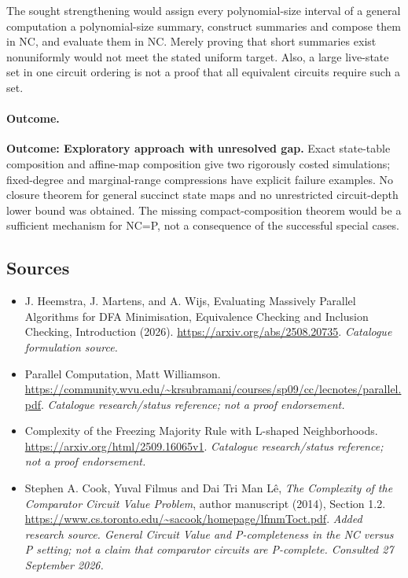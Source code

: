 \documentclass[11pt,a4paper]{article}
\begin{document}
The sought strengthening would assign every polynomial-size interval of
a general computation a polynomial-size summary, construct summaries and
compose them in NC, and evaluate them in NC. Merely proving that short
summaries exist nonuniformly would not meet the stated uniform target.
Also, a large live-state set in one circuit ordering is not a proof that
all equivalent circuits require such a set.

\paragraph{Outcome.}
\textbf{Outcome: Exploratory approach with unresolved gap.}
Exact state-table composition and affine-map composition give two rigorously
costed simulations; fixed-degree and marginal-range compressions have
explicit failure examples. No closure theorem for general succinct state
maps and no unrestricted circuit-depth lower bound was obtained. The
missing compact-composition theorem would be a sufficient mechanism for
NC=P, not a consequence of the successful special cases.
\subsection{Sources}
\begin{itemize}\raggedright
\item[\textnormal{[S1]}]\hypertarget{source:statement:1}{} J. Heemstra, J. Martens, and A. Wijs, Evaluating Massively Parallel Algorithms for DFA Minimisation, Equivalence Checking and Inclusion Checking, Introduction (2026).
\url{https://arxiv.org/abs/2508.20735}.
{\small\textit{Catalogue formulation source.}}
\item[\textnormal{[S2]}]\hypertarget{source:statement:2}{} Parallel Computation, Matt Williamson.
\url{https://community.wvu.edu/~krsubramani/courses/sp09/cc/lecnotes/parallel.pdf}.
{\small\textit{Catalogue research/status reference; not a proof endorsement.}}
\item[\textnormal{[S3]}]\hypertarget{source:statement:3}{} Complexity of the Freezing Majority Rule with L-shaped Neighborhoods.
\url{https://arxiv.org/html/2509.16065v1}.
{\small\textit{Catalogue research/status reference; not a proof endorsement.}}
\item[\textnormal{[E1]}]\hypertarget{extra:statement:1}{} Stephen A. Cook, Yuval Filmus and Dai Tri Man Lê, \emph{The Complexity of the Comparator Circuit Value Problem}, author manuscript (2014), Section 1.2.
\url{https://www.cs.toronto.edu/~sacook/homepage/lfmmToct.pdf}.
{\small\textit{Added research source. General Circuit Value and P-completeness in the NC versus P setting; not a claim that comparator circuits are P-complete. Consulted 27 September 2026.}}
\end{itemize}

\end{document}
